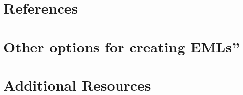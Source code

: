 \documentclass[
  letterpaper,
  DIV=11,
  numbers=noendperiod]{scrreprt}
\newlength{\cslhangindent}
\newlength{\cslentryspacingunit} %
\newenvironment{CSLReferences}[2] %
 {%
  \setlength{\parindent}{0pt}
  \ifodd #1
  \let\oldpar\par
  \def\par{\hangindent=\cslhangindent\oldpar}
  \fi
  \setlength{\parskip}{#2\cslentryspacingunit}
 }%
 {}
\begin{document}
\hypertarget{references}{%
\chapter*{References}\label{references}}

\hypertarget{refs}{}
\begin{CSLReferences}{0}{0}
\end{CSLReferences}


\hypertarget{other-options-for-creating-emls}{%
\chapter*{Other options for creating
EMLs''}\label{other-options-for-creating-emls}}


\hypertarget{additional-resources}{%
\chapter*{Additional Resources}\label{additional-resources}}
\end{document}
